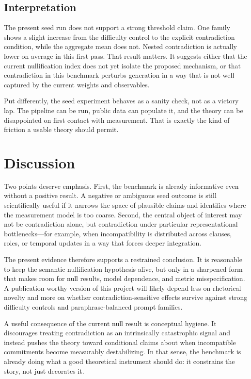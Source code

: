 \documentclass{svjour3}
\begin{document}
\subsection{Interpretation}
The present seed run does not support a strong threshold claim. One family shows a slight increase from the difficulty control to the explicit contradiction condition, while the aggregate mean does not. Nested contradiction is actually lower on average in this first pass. That result matters. It suggests either that the current nullification index does not yet isolate the proposed mechanism, or that contradiction in this benchmark perturbs generation in a way that is not well captured by the current weights and observables.

Put differently, the seed experiment behaves as a sanity check, not as a victory lap. The pipeline can be run, public data can populate it, and the theory can be disappointed on first contact with measurement. That is exactly the kind of friction a usable theory should permit.

\section{Discussion}
Two points deserve emphasis. First, the benchmark is already informative even without a positive result. A negative or ambiguous seed outcome is still scientifically useful if it narrows the space of plausible claims and identifies where the measurement model is too coarse. Second, the central object of interest may not be contradiction alone, but contradiction under particular representational bottlenecks---for example, when incompatibility is distributed across clauses, roles, or temporal updates in a way that forces deeper integration.

The present evidence therefore supports a restrained conclusion. It is reasonable to keep the semantic nullification hypothesis alive, but only in a sharpened form that makes room for null results, model dependence, and metric misspecification. A publication-worthy version of this project will likely depend less on rhetorical novelty and more on whether contradiction-sensitive effects survive against strong difficulty controls and paraphrase-balanced prompt families.

A useful consequence of the current null result is conceptual hygiene. It discourages treating contradiction as an intrinsically catastrophic signal and instead pushes the theory toward conditional claims about when incompatible commitments become measurably destabilizing. In that sense, the benchmark is already doing what a good theoretical instrument should do: it constrains the story, not just decorates it.
\end{document}
